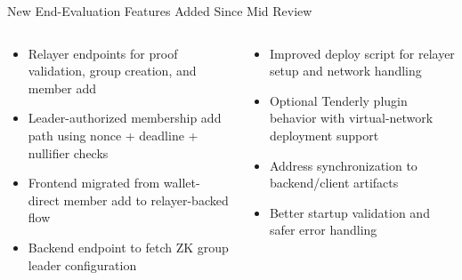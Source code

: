\documentclass[aspectratio=169]{beamer}
\begin{document}
\begin{frame}{New End-Evaluation Features Added Since Mid Review}
\begin{columns}[t]
\begin{tcolorbox}[bluebox, title=\textbf{ZK/Relayer Enhancements}]
\scriptsize
\begin{itemize}
  \item Relayer endpoints for proof validation, group creation, and member add
  \item Leader-authorized membership add path using nonce + deadline + nullifier checks
  \item Frontend migrated from wallet-direct member add to relayer-backed flow
  \item Backend endpoint to fetch ZK group leader configuration
\end{itemize}
\end{tcolorbox}
\begin{tcolorbox}[greenbox, title=\textbf{Deployment/Operations Enhancements}]
\scriptsize
\begin{itemize}
  \item Improved deploy script for relayer setup and network handling
  \item Optional Tenderly plugin behavior with virtual-network deployment support
  \item Address synchronization to backend/client artifacts
  \item Better startup validation and safer error handling
\end{itemize}
\end{tcolorbox}
\end{columns}
\end{frame}
\end{document}
